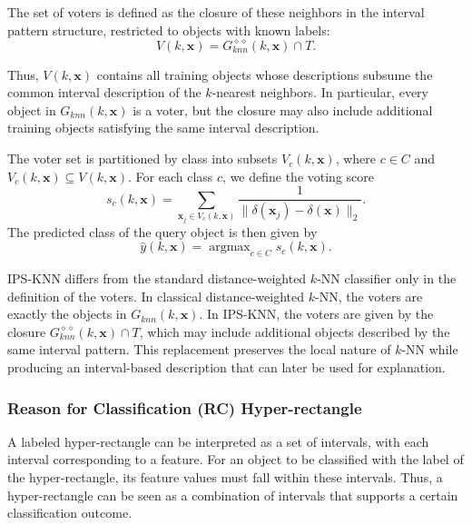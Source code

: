 \documentclass[a4paper,fleqn]{cas-sc}
\DeclareMathOperator*{\argmax}{argmax}
\begin{document}
The set of voters is defined as the closure of these neighbors in the interval pattern structure, restricted to objects with known labels:
\begin{equation}\label{section_3:eq_voting_closure}
    V(k,\mathbf{x}) = G_{knn}^{\diamond\diamond}(k,\mathbf{x}) \cap T.
\end{equation}

Thus, \(V(k,\mathbf{x})\) contains all training objects whose descriptions subsume the common interval description of the \(k\)-nearest neighbors. In particular, every object in \(G_{knn}(k,\mathbf{x})\) is a voter, but the closure may also include additional training objects satisfying the same interval description.

The voter set is partitioned by class into subsets \(V_c(k,\mathbf{x})\), where \(c\in C\) and \(V_c(k,\mathbf{x}) \subseteq V(k,\mathbf{x})\). For each class \(c\), we define the voting score
\begin{equation}\label{eq:voting_score}
    s_c(k,\mathbf{x}) = \sum_{\mathbf{x}_j \in V_c(k,\mathbf{x})}
    \frac{1}{\|\delta(\mathbf{x}_j)-\delta(\mathbf{x})\|_2}.
\end{equation}
The predicted class of the query object is then given by
\begin{equation}
    \hat{y}(k,\mathbf{x}) = \argmax_{c\in C} s_c(k,\mathbf{x}).
\end{equation}

IPS-KNN differs from the standard distance-weighted \(k\)-NN classifier only in the definition of the voters. In classical distance-weighted \(k\)-NN, the voters are exactly the objects in \(G_{knn}(k,\mathbf{x})\). In IPS-KNN, the voters are given by the closure \(G_{knn}^{\diamond\diamond}(k,\mathbf{x}) \cap T\), which may include additional objects described by the same interval pattern. This replacement preserves the local nature of \(k\)-NN while producing an interval-based description that can later be used for explanation.

\subsubsection{Reason for Classification (RC) Hyper-rectangle}
A labeled hyper-rectangle can be interpreted as a set of intervals, with each interval corresponding to a feature. For an object to be classified with the label of the hyper-rectangle, its feature values must fall within these intervals. Thus, a hyper-rectangle can be seen as a combination of intervals that supports a certain classification outcome.
\end{document}
